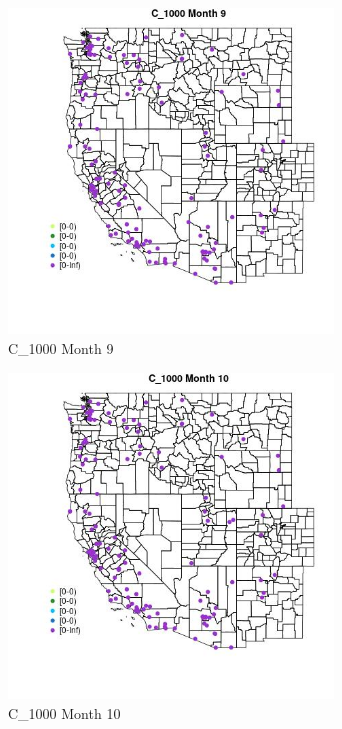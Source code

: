 \begin{figure} 
\centering  
\includegraphics[width=0.77\textwidth]{Code_Outputs/Report_ML_input_PM25_Step4_part_e_de_duplicated_aves_MapObsMo9C_1000.jpg} 
\caption{\label{fig:Report_ML_input_PM25_Step4_part_e_de_duplicated_avesMapObsMo9C_1000}C_1000 Month 9} 
\end{figure} 
 

\begin{figure} 
\centering  
\includegraphics[width=0.77\textwidth]{Code_Outputs/Report_ML_input_PM25_Step4_part_e_de_duplicated_aves_MapObsMo10C_1000.jpg} 
\caption{\label{fig:Report_ML_input_PM25_Step4_part_e_de_duplicated_avesMapObsMo10C_1000}C_1000 Month 10} 
\end{figure} 
 

